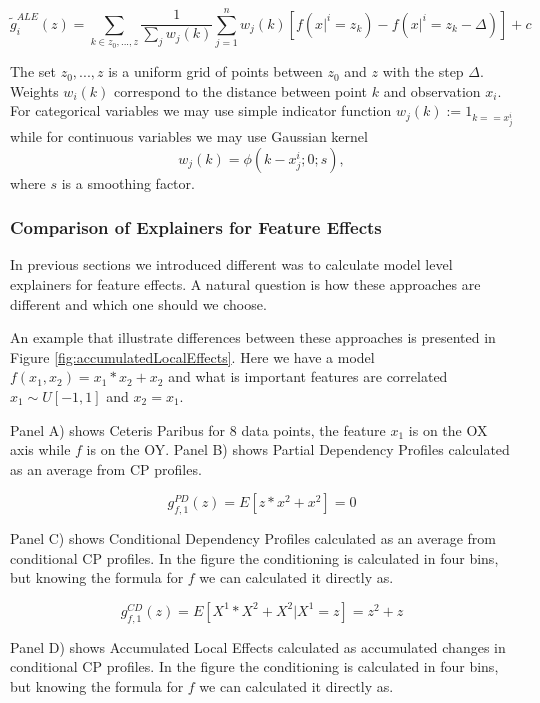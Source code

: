 \documentclass[12pt,]{krantz}
\begin{document}
\begin{equation}
\tilde g^{ALE}_i(z) = \sum_{k \in {z_0, ..., z}} \frac{1}{\sum_{j} w_{j}(k)} \sum_{j=1}^n w_{j}(k) \left[f(x|^i = z_k) - f(x|^i = z_k - \Delta)\right] + c
\label{eq:ALEPest2}
\end{equation}

The set \({z_0, ..., z}\) is a uniform grid of points between \(z_0\) and \(z\) with the step \(\Delta\).
Weights \(w_i(k)\) correspond to the distance between point \(k\) and observation \(x_i\). For categorical variables we may use simple indicator function \(w_j(k) := 1_{k == x_j^i}\) while for continuous variables we may use Gaussian kernel
\[
w_j(k) = \phi(k - x_j^i; 0; s),
\]
where \(s\) is a smoothing factor.

\hypertarget{summaryFeatureEffects}{%
\subsubsection{Comparison of Explainers for Feature Effects}\label{summaryFeatureEffects}}

In previous sections we introduced different was to calculate model level explainers for feature effects.
A natural question is how these approaches are different and which one should we choose.

An example that illustrate differences between these approaches is presented in Figure \ref{fig:accumulatedLocalEffects}.
Here we have a model \(f(x_1, x_2) = x_1*x_2 + x_2\) and what is important features are correlated \(x_1 \sim U[-1,1]\) and \(x_2 = x_1\).

Panel A) shows Ceteris Paribus for 8 data points, the feature \(x_1\) is on the OX axis while \(f\) is on the OY.
Panel B) shows Partial Dependency Profiles calculated as an average from CP profiles.

\[
g^{PD}_{f,1}(z) = E[z*x^2 + x^2] = 0
\]

Panel C) shows Conditional Dependency Profiles calculated as an average from conditional CP profiles. In the figure the conditioning is calculated in four bins, but knowing the formula for \(f\) we can calculated it directly as.

\[
g^{CD}_{f,1}(z) = E[X^1*X^2 + X^2 | X^1 = z] = z^2+z
\]

Panel D) shows Accumulated Local Effects calculated as accumulated changes in conditional CP profiles. In the figure the conditioning is calculated in four bins, but knowing the formula for \(f\) we can calculated it directly as.
\end{document}
